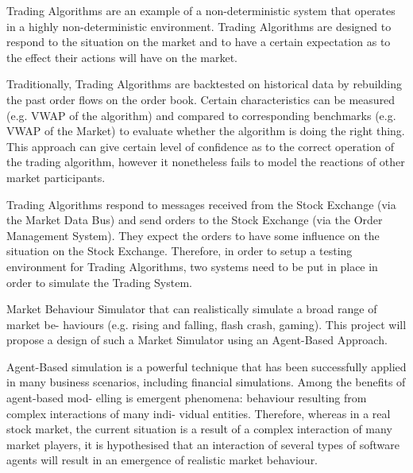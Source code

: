 Trading Algorithms are an example of a non-deterministic system that operates in a highly non-deterministic environment. Trading Algorithms are designed to respond to the situation on the market and to have a certain expectation as to the effect their actions will have on the market.

Traditionally, Trading Algorithms are backtested on historical data by rebuilding the past order flows on the order book. Certain characteristics can be measured (e.g. VWAP of the algorithm) and compared to corresponding benchmarks (e.g. VWAP of the Market) to evaluate whether the algorithm is doing the right thing. This approach can give certain level of confidence as to the correct operation of the trading algorithm, however it nonetheless fails to model the reactions of other market participants.

   

\pagebreak

Trading Algorithms respond to messages received from the Stock Exchange (via the Market Data Bus) and send orders to the Stock Exchange (via the Order Management System). They expect the orders to have some influence on the situation on the Stock Exchange.
Therefore, in order to setup a testing environment for Trading Algorithms, two systems need to be put in place in order to simulate the Trading System.

Market Behaviour Simulator that can realistically simulate a broad range of market be- haviours (e.g. rising and falling, flash crash, gaming). This project will propose a design of such a Market Simulator using an Agent-Based Approach.

Agent-Based simulation is a powerful technique that has been successfully applied in many business scenarios, including financial simulations. Among the benefits of agent-based mod- elling is emergent phenomena: behaviour resulting from complex interactions of many indi- vidual entities.
Therefore, whereas in a real stock market, the current situation is a result of a complex interaction of many market players, it is hypothesised that an interaction of several types of software agents will result in an emergence of realistic market behaviour.


